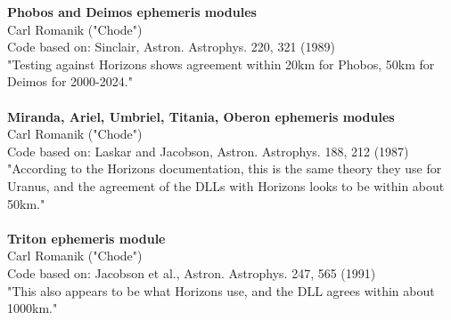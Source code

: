 \documentclass[Orbiter User Manual.tex]{subfiles}
\begin{document}
\textbf{Phobos and Deimos ephemeris modules}\\
Carl Romanik ("Chode")\\
Code based on: Sinclair, Astron. Astrophys. 220, 321 (1989)\\
"Testing against Horizons shows agreement within 20km for Phobos, 50km for Deimos for 2000-2024."\\
\\
\textbf{Miranda, Ariel, Umbriel, Titania, Oberon ephemeris modules}\\
Carl Romanik ("Chode")\\
Code based on: Laskar and Jacobson, Astron. Astrophys. 188, 212 (1987)\\
"According to the Horizons documentation, this is the same theory they use for Uranus, and the agreement of the DLLs with Horizons looks to be within about 50km."\\
\\
\textbf{Triton ephemeris module}\\
Carl Romanik ("Chode")\\
Code based on: Jacobson et al., Astron. Astrophys. 247, 565 (1991)\\
"This also appears to be what Horizons use, and the DLL agrees within about 1000km."
\\
\end{document}

